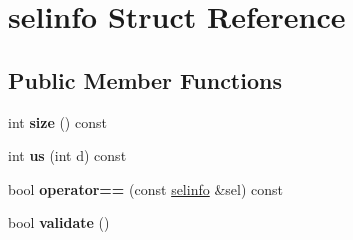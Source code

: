 \hypertarget{structselinfo}{}\section{selinfo Struct Reference}
\label{structselinfo}
\subsection*{Public Member Functions}
\begin{DoxyCompactItemize}
\item 
\mbox{\label{structselinfo_a1cc7c0b854bfdc8efb706421b4045ee8}} 
int {\bfseries size} () const
\item 
\mbox{\label{structselinfo_aeb8060fcec6624b27fd6a15262ba1e1d}} 
int {\bfseries us} (int d) const
\item 
\mbox{\label{structselinfo_a0bdce764fe16692a629ed9989f52d5d7}} 
bool {\bfseries operator==} (const \hyperlink{structselinfo}{selinfo} \&sel) const
\item 
\mbox{\label{structselinfo_a4010da847931a5c2b27e19a9a2432f66}} 
bool {\bfseries validate} ()
\end{DoxyCompactItemize}
